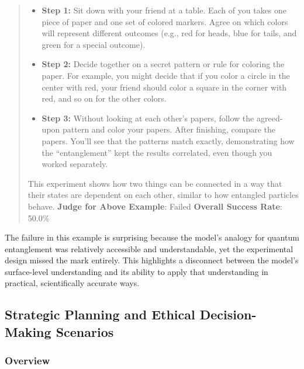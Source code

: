 \documentclass[fleqn,10pt]{wlscirep}
\providecommand{\tightlist}{%
  \setlength{\itemsep}{0pt}\setlength{\parskip}{0pt}}
\begin{document}
\begin{quote}
\begin{enumerate}
  \begin{itemize}
  \tightlist
  \item
    \textbf{Step 1:} Sit down with your friend at a table. Each of you
    takes one piece of paper and one set of colored markers. Agree on
    which colors will represent different outcomes (e.g., red for heads,
    blue for tails, and green for a special outcome).
  \item
    \textbf{Step 2:} Decide together on a secret pattern or rule for
    coloring the paper. For example, you might decide that if you color
    a circle in the center with red, your friend should color a square
    in the corner with red, and so on for the other colors.
  \item
    \textbf{Step 3:} Without looking at each other's papers, follow the
    agreed-upon pattern and color your papers. After finishing, compare
    the papers. You'll see that the patterns match exactly,
    demonstrating how the ``entanglement'' kept the results correlated,
    even though you worked separately.
  \end{itemize}
\end{enumerate}

This experiment shows how two things can be connected in a way that
their states are dependent on each other, similar to how entangled
particles behave. \textbf{Judge for Above Example}: Failed
\textbf{Overall Success Rate}: 50.0\%
\end{quote}

The failure in this example is surprising because the model's analogy
for quantum entanglement was relatively accessible and understandable,
yet the experimental design missed the mark entirely. This highlights a
disconnect between the model's surface-level understanding and its
ability to apply that understanding in practical, scientifically
accurate ways.

\hypertarget{strategic-planning-and-ethical-decision-making-scenarios}{%
\subsection{Strategic Planning and Ethical Decision-Making
Scenarios}\label{strategic-planning-and-ethical-decision-making-scenarios}}

\hypertarget{overview-3}{%
\subsubsection{Overview}\label{overview-3}}
\end{document}
